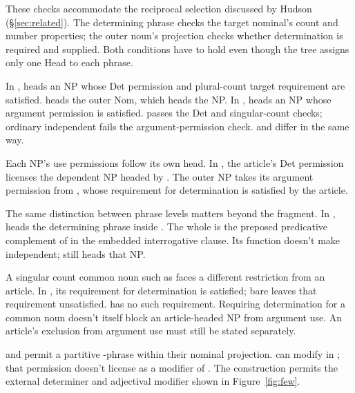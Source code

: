\documentclass[12pt]{article}
\begin{document}
These checks accommodate the reciprocal selection discussed by Hudson (§\ref{sec:related}). The determining phrase checks the target nominal's count and number properties; the outer noun's projection checks whether determination is required and supplied. Both conditions have to hold even though the tree assigns only one Head to each phrase.

In ,  heads an NP whose Det permission and plural-count target requirement are satisfied.  heads the outer Nom, which heads the NP. In ,  heads an NP whose argument permission is satisfied.  passes the Det and singular-count checks; ordinary independent  fails the argument-permission check.  and  differ in the same way.

Each NP's use permissions follow its own head. In , the article's Det permission licenses the dependent NP headed by . The outer NP takes its argument permission from , whose requirement for determination is satisfied by the article.

The same distinction between phrase levels matters beyond the fragment. In ,  heads the determining phrase inside . The whole  is the preposed predicative complement of  in the embedded interrogative clause. Its function doesn't make  independent;  still heads that NP.

A singular count common noun such as  faces a different restriction from an article. In , its requirement for determination is satisfied; bare  leaves that requirement unsatisfied.  has no such requirement. Requiring determination for a common noun doesn't itself block an article-headed NP from argument use. An article's exclusion from argument use must still be stated separately.

 and  permit a partitive -phrase within their nominal projection.  can modify  in ; that permission doesn't license  as a modifier of . The construction  permits the external determiner and adjectival modifier shown in Figure~\ref{fig:few}.
\end{document}
